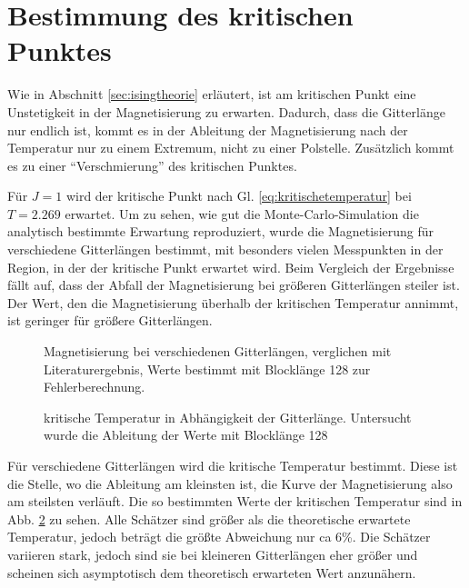 	\section{Bestimmung des kritischen Punktes}
	\label{sec:bestkritpunkt}
	
	Wie in Abschnitt \ref{sec:isingtheorie} erläutert, ist am kritischen Punkt eine Unstetigkeit in der Magnetisierung zu erwarten. Dadurch, dass die Gitterlänge nur endlich ist, kommt es in der Ableitung der Magnetisierung nach der Temperatur nur zu einem Extremum, nicht zu einer Polstelle. Zusätzlich kommt es zu einer \enquote{Verschmierung} des kritischen Punktes\cite[vgl. ][S. 104]{binderheermann}.
	
	Für $J=1$ wird der kritische Punkt nach Gl. \ref{eq:kritischetemperatur} bei $T=\num{2,269}$ erwartet.
	Um zu sehen, wie gut die Monte-Carlo-Simulation die analytisch bestimmte Erwartung reproduziert, wurde die Magnetisierung für verschiedene Gitterlängen bestimmt, mit besonders vielen Messpunkten in der Region, in der der kritische Punkt erwartet wird. Beim Vergleich der Ergebnisse fällt auf, dass der Abfall der Magnetisierung bei größeren Gitterlängen steiler ist. Der Wert, den die Magnetisierung überhalb der kritischen Temperatur annimmt, ist geringer für größere Gitterlängen.
	
	\begin{figure}[htbp]
		
		\caption[Magnetisierung bei verschiedenen Gitterlängen]{Magnetisierung bei verschiedenen Gitterlängen, verglichen mit Literaturergebnis, Werte bestimmt mit Blocklänge 128 zur Fehlerberechnung.}
		\label{fig:maglaenge}
	\end{figure}
	
	\begin{figure}[htbp]
		
		\caption[kritische Temperatur in Abhängigkeit der Gitterlänge]{kritische Temperatur in Abhängigkeit der Gitterlänge. Untersucht wurde die Ableitung der Werte mit Blocklänge 128}
		\label{fig:tkritlaenge}
	\end{figure}
	
	Für verschiedene Gitterlängen wird die kritische Temperatur bestimmt. Diese ist die Stelle, wo die Ableitung am kleinsten ist, die Kurve der Magnetisierung also am steilsten verläuft. Die so bestimmten Werte der kritischen Temperatur sind in Abb. \ref{fig:tkritlaenge} zu sehen. Alle Schätzer sind größer als die theoretische erwartete Temperatur, jedoch beträgt die größte Abweichung nur ca 6\%. Die Schätzer variieren stark, jedoch sind sie bei kleineren Gitterlängen eher größer und scheinen sich asymptotisch dem theoretisch erwarteten Wert anzunähern.
	
